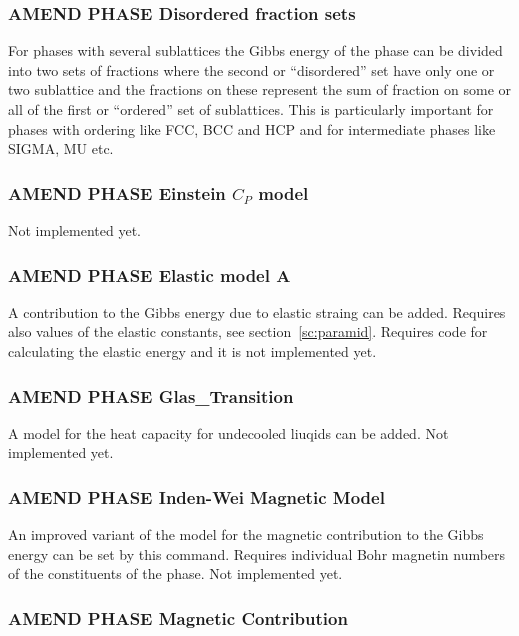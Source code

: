 \documentclass[12pt]{article}
\begin{document}
\subsubsection{AMEND PHASE Disordered fraction sets}

For phases with several sublattices the Gibbs energy of the phase can
be divided into two sets of fractions where the second or
``disordered'' set have only one or two sublattice and the fractions
on these represent the sum of fraction on some or all of the first or
``ordered'' set of sublattices.  This is particularly important for
phases with ordering like FCC, BCC and HCP and for intermediate phases
like SIGMA, MU etc.

\subsubsection{AMEND PHASE Einstein $C_P$ model}

Not implemented yet.

\subsubsection{AMEND PHASE Elastic model A}

A contribution to the Gibbs energy due to elastic straing can be
added.  Requires also values of the elastic constants, see
section~\ref{sc:paramid}.  Requires code for calculating the
elastic energy and it is not implemented yet.

\subsubsection{AMEND PHASE Glas\_Transition}

A model for the heat capacity for undecooled liuqids can be added.
Not implemented yet.

\subsubsection{AMEND PHASE Inden-Wei Magnetic Model}

An improved variant of the model for the magnetic contribution to the
Gibbs energy can be set by this command.  Requires individual Bohr
magnetin numbers of the constituents of the phase.  Not implemented
yet.

\subsubsection{AMEND PHASE Magnetic Contribution}
\end{document}
